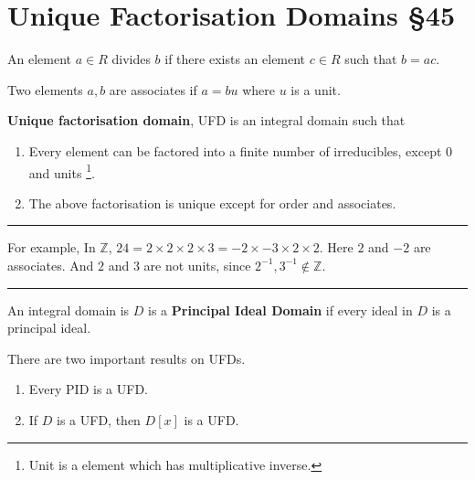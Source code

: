 \section{Unique Factorisation Domains \S45}
\begin{definition}[divides]
	An element $a \in R$ divides $b$ if there exists an element $c \in R$ such that $b = ac$.
\end{definition}
\begin{definition}[associate]
	Two elements $a,b$ are associates if $a = bu$ where $u$ is a unit.
\end{definition}
\begin{definition}[UFD]
	\textbf{Unique factorisation domain}, UFD is an integral domain such that
	\begin{enumerate}
		\item Every element can be factored into a finite number of irreducibles, except 0 and units
		\dag\footnote{
			Unit is a element which has multiplicative inverse.}.
		\item The above factorisation is unique except for order and associates.
	\end{enumerate}
\end{definition}
\hrule\vspace{1em}
For example, In $\mathbb{Z}$, $24 = 2 \times 2 \times 2 \times 3 = -2 \times -3 \times 2 \times 2$.
Here $2$ and $-2$ are associates.
And $2$ and $3$ are not units, since $2^{-1}, 3^{-1} \notin \mathbb{Z}$.
\hrule\vspace{1em}
\begin{definition}[PID]
	An integral domain is $D$ is a \textbf{Principal Ideal Domain} if every ideal in $D$ is a principal ideal.
\end{definition}
There are two important results on UFDs.
\begin{enumerate}
	\item Every PID is a UFD.
	\item If $D$ is a UFD, then $D[x]$ is a UFD.
\end{enumerate}

